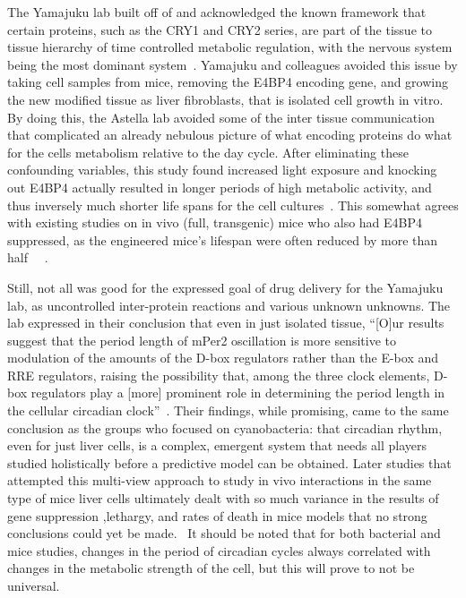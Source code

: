 \documentclass [12pt]{article}
\begin{document}
	\indent The Yamajuku lab built off of and acknowledged the known framework that certain proteins, such as the CRY1 and CRY2 series, are part of the tissue to tissue hierarchy of time controlled metabolic regulation, with the nervous system being the most dominant system~\autocite{Yamajuku2011}.  Yamajuku and colleagues avoided this issue by taking cell samples from mice, removing the E4BP4 encoding gene, and growing the new modified tissue as liver fibroblasts, that is isolated cell growth in vitro. By doing this, the Astella lab avoided some of the inter tissue communication that complicated an already nebulous picture of what encoding proteins do what for the cells metabolism relative to the day cycle. After eliminating these confounding variables, this study found increased light exposure and knocking out E4BP4 actually resulted in longer periods of  high metabolic activity, and thus inversely much shorter life spans for the cell cultures~\autocite{Yamajuku2011}. This somewhat agrees with existing studies on in vivo (full, transgenic) mice who also had E4BP4 suppressed, as the engineered mice's lifespan were often reduced by more than half~\autocite{Cohen2015} ~\autocite{Yamajuku2011}. \par
	\indent Still, not all was good for the expressed goal of drug delivery for the Yamajuku lab, as uncontrolled inter-protein reactions and various unknown unknowns.  The lab expressed in their conclusion that even in just isolated tissue, {``}[O]ur results suggest that the period length of mPer2 oscillation is more sensitive to modulation of the amounts of the D-box regulators rather than the E-box and RRE regulators, raising the possibility that, among the three clock elements, D-box regulators play a [more]  prominent role in determining the period length in the cellular circadian clock''~\autocite{Yamajuku2011}. Their findings, while promising, came to the same conclusion as the groups who focused on cyanobacteria: that circadian rhythm, even for just liver cells, is a complex, emergent system that needs all players studied holistically before a predictive model can be obtained. Later studies that attempted this multi-view approach to study in vivo interactions in the same type of mice liver cells ultimately dealt with so much variance in the results of gene suppression ,lethargy, and rates of death in mice models that no strong conclusions could yet be made.~\autocite{Kepsutlu2014} It should be noted that for both bacterial and mice studies, changes in the period of circadian cycles always correlated with changes in the metabolic strength of the cell, but this will prove to not be universal.
\newpage
\end{document}
